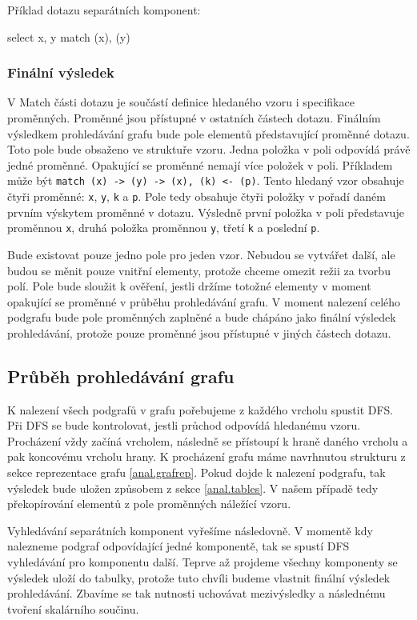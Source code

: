 Příklad dotazu separátních komponent:
\begin{code}
select x, y match (x), (y)
\end{code}

\subsubsection{Finální výsledek}

V Match části dotazu je součástí definice hledaného vzoru i specifikace proměnných.
Proměnné jsou přístupné v ostatních částech dotazu.
Finálním výsledkem prohledávání grafu bude pole elementů představující proměnné dotazu.
Toto pole bude obsaženo ve struktuře vzoru.
Jedna položka v poli odpovídá právě jedné proměnné.
Opakující se proměnné nemají více položek v poli.
Příkladem může být \texttt{match (x) -> (y) -> (x), (k) <- (p)}.
Tento hledaný vzor obsahuje čtyři proměnné: \texttt{x}, \texttt{y}, \texttt{k} a \texttt{p}.
Pole tedy obsahuje čtyři položky v pořadí daném prvním výskytem proměnné v dotazu.
Výsledně první položka v poli představuje proměnnou \texttt{x}, druhá položka proměnnou \texttt{y}, třetí \texttt{k} a poslední \texttt{p}.

Bude existovat pouze jedno pole pro jeden vzor. 
Nebudou se vytvářet další, ale budou se měnit pouze vnitřní elementy, protože chceme omezit režii za tvorbu polí.
Pole bude sloužit k ověření, jestli držíme totožné elementy v moment opakující se proměnné v průběhu prohledávání grafu.
V moment nalezení celého podgrafu bude pole proměnných zaplněné a bude chápáno jako finální výsledek prohledávání, protože pouze proměnné jsou přístupné v jiných částech dotazu.

\subsection{Průběh prohledávání grafu}

K nalezení všech podgrafů v grafu pořebujeme z každého vrcholu spustit DFS.
Při DFS se bude kontrolovat, jestli průchod odpovídá hledanému vzoru.
Procházení vždy začíná vrcholem, následně se přístoupí k hraně daného vrcholu a pak koncovému vrcholu hrany. 
K procházení grafu máme navrhnutou strukturu z sekce reprezentace grafu \ref{anal.grafrep}.
Pokud dojde k nalezení podgrafu, tak výsledek bude uložen způsobem z sekce \ref{anal.tables}.
V našem případě tedy překopírování elementů z pole proměnných náležící vzoru.

Vyhledávání separátních komponent vyřešíme následovně.
V momentě kdy nalezneme podgraf odpovídající jedné komponentě, tak se spustí DFS vyhledávání pro komponentu další.
Teprve až projdeme všechny komponenty se výsledek uloží do tabulky, protože tuto chvíli budeme vlastnit finální výsledek prohledávání.
Zbavíme se tak nutnosti uchovávat mezivýsledky a následnému tvoření skalárního součinu.

